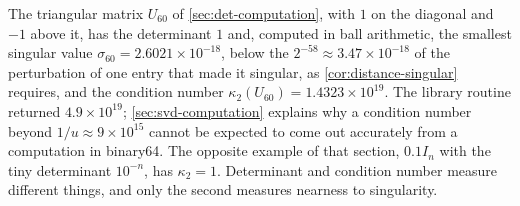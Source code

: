 \begin{table}
\end{table}

The triangular matrix $U_{60}$ of \cref{sec:det-computation}, with $1$ on the diagonal and $-1$ above it, has the determinant $1$ and, computed in ball arithmetic, the smallest singular value $\sigma_{60}=2.6021\times10^{-18}$, below the $2^{-58}\approx3.47\times10^{-18}$ of the perturbation of one entry that made it singular, as \cref{cor:distance-singular} requires, and the condition number $\kappa_2(U_{60})=1.4323\times10^{19}$. The library routine  returned $4.9\times10^{19}$; \cref{sec:svd-computation} explains why a condition number beyond $1/u\approx9\times10^{15}$ cannot be expected to come out accurately from a computation in binary64. The opposite example of that section, $0.1I_n$ with the tiny determinant $10^{-n}$, has $\kappa_2=1$. Determinant and condition number measure different things, and only the second measures nearness to singularity.

